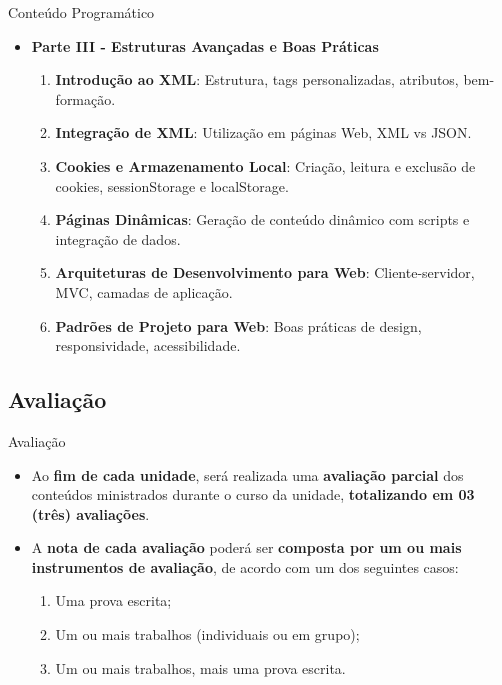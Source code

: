 \documentclass{beamer}
\begin{document}
\begin{frame}{Conteúdo Programático}
    \begin{itemize}
        \justifying
        \item \textbf{Parte III - Estruturas Avançadas e Boas Práticas}
            \begin{enumerate}
                \justifying
                \item \textbf{Introdução ao XML}: Estrutura, tags personalizadas, atributos, bem-formação.
                \item \textbf{Integração de XML}: Utilização em páginas Web, XML vs JSON.
                \item \textbf{Cookies e Armazenamento Local}: Criação, leitura e exclusão de cookies, sessionStorage e localStorage.
                \item \textbf{Páginas Dinâmicas}: Geração de conteúdo dinâmico com scripts e integração de dados.
                \item \textbf{Arquiteturas de Desenvolvimento para Web}: Cliente-servidor, MVC, camadas de aplicação.
                \item \textbf{Padrões de Projeto para Web}: Boas práticas de design, responsividade, acessibilidade.
            \end{enumerate}
    \end{itemize}
\end{frame}

\subsection{Avaliação}

\begin{frame}{Avaliação}
    \begin{itemize}
        \justifying
        \item Ao \textbf{fim de cada unidade}, será realizada uma \textbf{avaliação parcial} dos conteúdos ministrados durante o curso da unidade, \alert{\textbf{totalizando em 03 (três) avaliações}}.
        \item A \textbf{nota de cada avaliação} poderá ser \textbf{composta por um ou mais instrumentos de avaliação}, de acordo com um dos seguintes casos:
        \begin{enumerate}
            \justifying
            \item Uma prova escrita;
            \item Um ou mais trabalhos (individuais ou em grupo);
            \item Um ou mais trabalhos, mais uma prova escrita.
        \end{enumerate}
    \end{itemize}
\end{frame}
\end{document}
